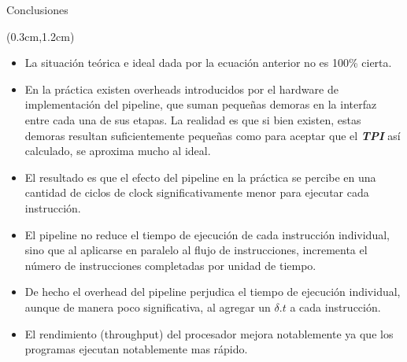 \documentclass[table,dvipsnames,aspectratio=169]{beamer}
\begin{document}
\begin{frame}{Conclusiones}
 \begin{textblock*}{\textwidth}(0.3cm,1.2cm)
  \begin{itemize}[<+(1)->] \justifying
   \item La situación teórica e ideal dada por la ecuación anterior \textcolor{furfiBlue}{no es 100\% cierta}.
   \item En la práctica existen \textcolor{furfiBlue}{overheads introducidos por el hardware} de implementación del pipeline, que suman \textcolor{furfiBlue}{pequeñas demoras} en la interfaz entre cada una de sus etapas. La realidad es que si bien existen, estas demoras resultan suficientemente pequeñas como para aceptar que el \textbf{\textit{TPI}} así calculado, se aproxima mucho al ideal.
   \item El resultado es que el efecto del pipeline en la práctica se percibe en una cantidad de ciclos de clock significativamente menor para ejecutar cada instrucción.
   \item \textcolor{furfiBlue}{El pipeline no reduce el tiempo de ejecución de cada instrucción individual}, sino que al aplicarse en paralelo al flujo de instrucciones, incrementa el número de instrucciones completadas por unidad de tiempo.
   \item De hecho el \textcolor{furfiBlue}{overhead del pipeline} perjudica el tiempo de ejecución individual, aunque de manera poco significativa, al agregar un $\delta.t$ a cada instrucción.
   \item El rendimiento (throughput) del procesador \textcolor{furfiBlue}{mejora notablemente} ya que los programas ejecutan notablemente mas rápido.
  \end{itemize}
 \end{textblock*}
\end{frame}
 
\end{document}
